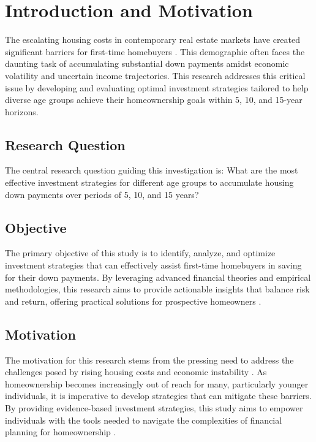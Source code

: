 \section{Introduction and Motivation}
The escalating housing costs in contemporary real estate markets have created significant barriers for first-time homebuyers \citep{fed2023, nar}. This demographic often faces the daunting task of accumulating substantial down payments amidst economic volatility and uncertain income trajectories. This research addresses this critical issue by developing and evaluating optimal investment strategies tailored to help diverse age groups achieve their homeownership goals within 5, 10, and 15-year horizons.

\subsection{Research Question}
The central research question guiding this investigation is: What are the most effective investment strategies for different age groups to accumulate housing down payments over periods of 5, 10, and 15 years?

\subsection{Objective}
The primary objective of this study is to identify, analyze, and optimize investment strategies that can effectively assist first-time homebuyers in saving for their down payments. By leveraging advanced financial theories and empirical methodologies, this research aims to provide actionable insights that balance risk and return, offering practical solutions for prospective homeowners \citep{markowitz1952portfolio, sharpe1966mutual}.

\subsection{Motivation}
The motivation for this research stems from the pressing need to address the challenges posed by rising housing costs and economic instability \citep{bls2023, fed2023}. As homeownership becomes increasingly out of reach for many, particularly younger individuals, it is imperative to develop strategies that can mitigate these barriers. By providing evidence-based investment strategies, this study aims to empower individuals with the tools needed to navigate the complexities of financial planning for homeownership \citep{nar}.
